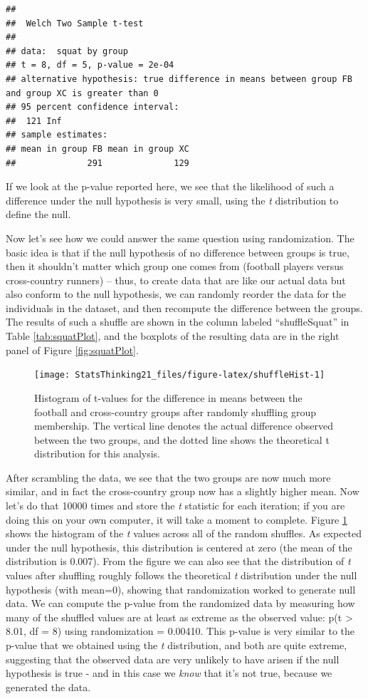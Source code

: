 \documentclass[
  12pt,
]{book}
\begin{document}
\begin{verbatim}
## 
##  Welch Two Sample t-test
## 
## data:  squat by group
## t = 8, df = 5, p-value = 2e-04
## alternative hypothesis: true difference in means between group FB and group XC is greater than 0
## 95 percent confidence interval:
##  121 Inf
## sample estimates:
## mean in group FB mean in group XC 
##              291              129
\end{verbatim}

If we look at the p-value reported here, we see that the likelihood of such a difference under the null hypothesis is very small, using the \emph{t} distribution to define the null.

Now let's see how we could answer the same question using randomization. The basic idea is that if the null hypothesis of no difference between groups is true, then it shouldn't matter which group one comes from (football players versus cross-country runners) -- thus, to create data that are like our actual data but also conform to the null hypothesis, we can randomly reorder the data for the individuals in the dataset, and then recompute the difference between the groups. The results of such a shuffle are shown in the column labeled ``shuffleSquat'' in Table \ref{tab:squatPlot}, and the boxplots of the resulting data are in the right panel of Figure \ref{fig:squatPlot}.

\begin{figure}
\texttt{[image: StatsThinking21\_files/figure-latex/shuffleHist-1]} \caption{Histogram of t-values for the difference in means between the football and cross-country groups after randomly shuffling group membership.  The vertical line denotes the actual difference observed between the two groups, and the dotted line shows the theoretical t distribution for this analysis.}\label{fig:shuffleHist}
\end{figure}

After scrambling the data, we see that the two groups are now much more similar, and in fact the cross-country group now has a slightly higher mean. Now let's do that 10000 times and store the \emph{t} statistic for each iteration; if you are doing this on your own computer, it will take a moment to complete. Figure \ref{fig:shuffleHist} shows the histogram of the \emph{t} values across all of the random shuffles. As expected under the null hypothesis, this distribution is centered at zero (the mean of the distribution is 0.007). From the figure we can also see that the distribution of \emph{t} values after shuffling roughly follows the theoretical \emph{t} distribution under the null hypothesis (with mean=0), showing that randomization worked to generate null data. We can compute the p-value from the randomized data by measuring how many of the shuffled values are at least as extreme as the observed value: p(t \textgreater{} 8.01, df = 8) using randomization = 0.00410. This p-value is very similar to the p-value that we obtained using the \emph{t} distribution, and both are quite extreme, suggesting that the observed data are very unlikely to have arisen if the null hypothesis is true - and in this case we \emph{know} that it's not true, because we generated the data.
\end{document}
